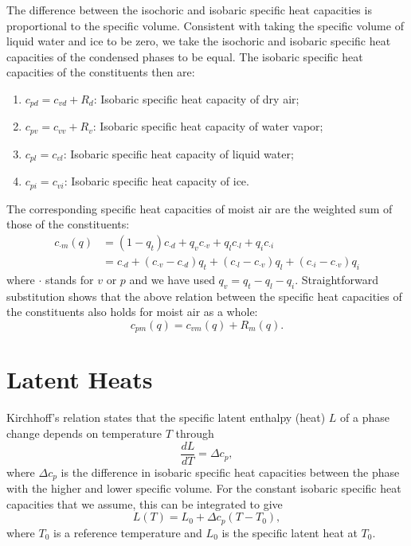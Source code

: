 \documentclass{report}
\begin{document}
The difference between the isochoric and isobaric specific heat capacities is proportional to the specific volume. Consistent with taking the specific volume of liquid water and ice to be zero, we take the isochoric and isobaric specific heat capacities of the condensed phases to be equal. The isobaric specific heat capacities of the constituents then are:
\begin{enumerate}
    \item $c_{pd} = c_{vd} + R_d$: Isobaric specific heat capacity of dry air;
    \item $c_{pv} = c_{vv} + R_v$: Isobaric specific heat capacity of water vapor;
    \item $c_{pl} = c_{vl}$: Isobaric specific heat capacity of liquid water;
    \item $c_{pi} = c_{vi}$: Isobaric specific heat capacity of ice.
\end{enumerate}

The corresponding specific heat capacities of moist air are the weighted sum of those of the constituents:
\begin{align}
    c_{\cdot m}(q) & = (1-q_t) c_{\cdot d} + q_v c_{\cdot v} + q_l c_{\cdot l} + q_i c_{\cdot i} \label{e:specific_heat}\\
    & = c_{\cdot d} + (c_{\cdot v} - c_{\cdot d})q_t + (c_{\cdot l} - c_{\cdot v})q_l + (c_{\cdot i} - c_{\cdot v})q_i
\end{align}
where $\cdot$ stands for $v$ or $p$ and we have used $q_v = q_t -q_l - q_i$. Straightforward substitution shows that the above relation between the specific heat capacities of the constituents also holds for moist air as a whole:
\begin{equation}\label{e:specific_heat_relation}
    c_{pm}(q) = c_{vm}(q) + R_m(q).
\end{equation}

\section{Latent Heats}

Kirchhoff's relation states that the specific latent enthalpy (heat) $L$ of a phase change depends on temperature $T$ through
\begin{equation}
    \frac{dL}{dT} = \Delta c_p,
\end{equation}
where $\Delta c_p$ is the difference in isobaric specific heat capacities between the phase with the higher and lower specific volume. For the constant isobaric specific heat capacities that we assume, this can be integrated to give
\begin{equation}
    L(T) = L_0 + \Delta c_p (T-T_0),
    \label{eq:LH_temperature}
\end{equation}
where $T_0$ is a reference temperature and $L_0$ is the specific latent heat at $T_0$. 
\end{document}
